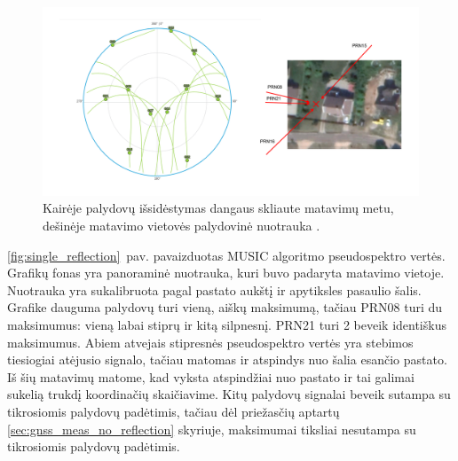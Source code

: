 \documentclass[main.tex]{subfiles}
\begin{document}
\begin{figure}[ht]
    \begin{centering}
    \includegraphics[scale=0.3]{drawings/one_reflection_sats.drawio}
    \par\end{centering}
    \protect\caption{\label{fig:single_reflection_sat_pos}Kairėje palydovų išsidėstymas dangaus skliaute matavimų metu, dešinėje matavimo vietovės palydovinė nuotrauka \cite{google_maps}.}
\end{figure}

\ref{fig:single_reflection}~pav. pavaizduotas MUSIC algoritmo pseudospektro vertės. Grafikų
fonas yra panoraminė nuotrauka, kuri buvo padaryta matavimo vietoje. Nuotrauka yra sukalibruota pagal
pastato aukštį ir apytiksles pasaulio šalis. Grafike dauguma palydovų turi vieną,
aiškų maksimumą, tačiau PRN08 turi du maksimumus: vieną labai stiprų ir kitą silpnesnį.
PRN21 turi 2 beveik identiškus maksimumus.
Abiem atvejais stipresnės pseudospektro vertės yra stebimos tiesiogiai atėjusio signalo, tačiau
matomas ir atspindys nuo šalia esančio pastato. Iš šių matavimų matome, kad vyksta atspindžiai
nuo pastato ir tai galimai sukelią trukdį koordinačių skaičiavime.
Kitų palydovų signalai beveik sutampa su tikrosiomis palydovų padėtimis, tačiau dėl priežasčių aptartų
\ref{sec:gnss_meas_no_reflection} skyriuje, maksimumai tiksliai nesutampa su tikrosiomis palydovų padėtimis.
\end{document}
